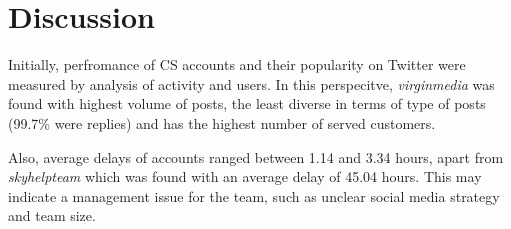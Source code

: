 \documentclass[sigconf]{acmart}
\begin{document}





\section{Discussion}\label{discussion}

Initially, perfromance of CS accounts and their popularity on Twitter were 
measured by analysis of activity and users. In this perspecitve, {\emph{virginmedia}} 
was found with highest volume of posts, the least diverse in terms of type of posts
(99.7\% were replies) and has the highest number of served customers.

Also, average delays of accounts ranged between 1.14 and
3.34 hours, apart from {\emph{skyhelpteam}} which was found with an average
delay of 45.04 hours. This may indicate a management issue for the
team, such as unclear social media strategy and team size. 
\end{document}
